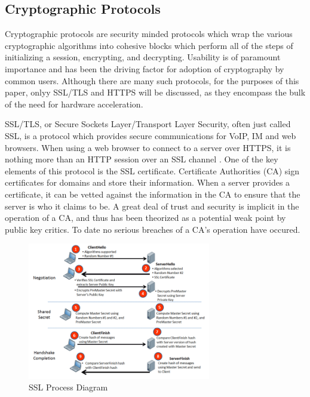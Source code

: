 \documentclass[journal]{IEEEtran}
\begin{document}
\subsection{Cryptographic Protocols}

Cryptographic protocols are security minded protocols which wrap the various cryptographic algorithms into cohesive blocks which perform all of the steps of initializing a session, encrypting, and decrypting.  Usability is of paramount importance and has been the driving factor for adoption of cryptography by common users.  Although there are many such protocols, for the purposes of this paper, onlyy SSL/TLS and HTTPS will be discussed, as they encompass the bulk of the need for hardware acceleration.

SSL/TLS, or Secure Sockets Layer/Transport Layer Security, often just called SSL, is a protocol which provides secure communications for VoIP, IM and web browsers.  When using a web browser to connect to a server over HTTPS, it is nothing more than an HTTP session over an SSL channel \cite{howSSLWorks}.  One of the key elements of this protocol is the SSL certificate.  Certificate Authorities (CA) sign certificates for domains and store their information.  When a server provides a certificate, it can be vetted against the information in the CA to ensure that the server is who it claims to be.  A great deal of trust and security is implicit in the operation of a CA, and thus has been theorized as a potential weak point by public key critics.  To date no serious breaches of a CA's operation have occured.

\begin{figure}[htbp]
	\centering
	\includegraphics[width=8cm,keepaspectratio]{img/sslDiagram.png}
	\caption{SSL Process Diagram \cite{sslImage} }
	\label{sslFigure}
\end{figure}
\end{document}
